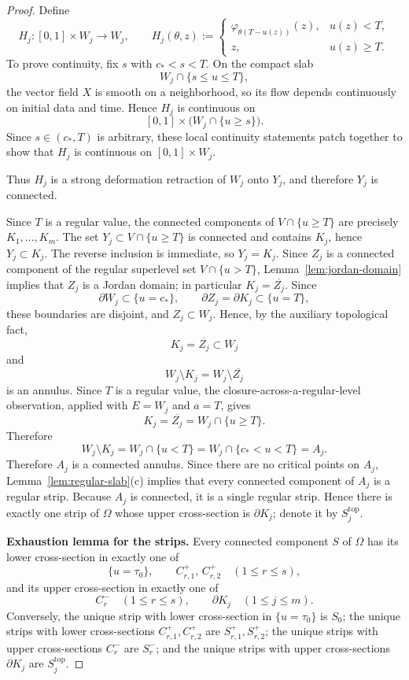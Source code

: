\documentclass[12pt]{amsart}
\theoremstyle{definition}
\theoremstyle{remark}
\begin{document}
\begin{proof}
Define
\[
H_j:[0,1]\times W_j\to W_j,
\qquad
H_j(\theta,z):=
\begin{cases}
\varphi_{\theta(T-u(z))}(z),& u(z)<T,\\[1mm]
z,& u(z)\ge T.
\end{cases}
\]
To prove continuity, fix $s$ with $c_*<s<T$. On the compact slab
\[
W_j\cap\{s\le u\le T\},
\]
the vector field $X$ is smooth on a neighborhood, so its flow depends continuously on
initial data and time. Hence $H_j$ is continuous on
\[
[0,1]\times \bigl(W_j\cap\{u\ge s\}\bigr).
\]
Since $s\in(c_*,T)$ is arbitrary, these local continuity statements patch together to show
that $H_j$ is continuous on $[0,1]\times W_j$.

Thus $H_j$ is a strong deformation retraction of $W_j$ onto $Y_j$, and therefore $Y_j$
is connected.

Since $T$ is a regular value, the connected components of $V\cap\{u\ge T\}$ are precisely $K_1,\dots,K_m$. The set $Y_j\subset V\cap\{u\ge T\}$ is connected and contains $K_j$, hence $Y_j\subset K_j$. The reverse inclusion is immediate, so $Y_j=K_j$. Since $Z_j$ is a connected component of the regular superlevel set $V\cap\{u>T\}$, Lemma~\ref{lem:jordan-domain} implies that $Z_j$ is a Jordan domain; in particular $K_j=\overline{Z_j}$. Since
\[
\partial W_j\subset \{u=c_*\},
\qquad
\partial Z_j=\partial K_j\subset \{u=T\},
\]
these boundaries are disjoint, and $Z_j\subset W_j$. Hence, by the auxiliary topological fact,
\[
K_j=\overline{Z_j}\subset W_j
\]
and
\[
W_j\setminus K_j=W_j\setminus \overline{Z_j}
\]
is an annulus. Since $T$ is a regular value, the closure-across-a-regular-level observation, applied with $E=W_j$ and $a=T$, gives
\[
K_j=\overline{Z_j}=W_j\cap\{u\ge T\}.
\]
Therefore
\[
W_j\setminus K_j
=
W_j\cap\{u<T\}
=
W_j\cap\{c_*<u<T\}
=
A_j.
\]
Therefore $A_j$ is a connected annulus. Since there are no critical points on $A_j$, Lemma~\ref{lem:regular-slab}(c) implies that every connected component of $A_j$ is a regular strip. Because $A_j$ is connected, it is a single regular strip. Hence there is exactly one strip of $\Omega$ whose upper cross-section is $\partial K_j$; denote it by $S_j^{\mathrm{top}}$.

\medskip
\noindent\textbf{Exhaustion lemma for the strips.}
Every connected component $S$ of $\Omega$ has its lower cross-section in exactly one of
\[
\{u=\tau_0\}, \qquad C_{r,1}^+,\, C_{r,2}^+ \quad (1\le r\le s),
\]
and its upper cross-section in exactly one of
\[
C_r^- \quad (1\le r\le s), \qquad \partial K_j \quad (1\le j\le m).
\]
Conversely, the unique strip with lower cross-section in $\{u=\tau_0\}$ is $S_0$;
the unique strips with lower cross-sections $C_{r,1}^+,C_{r,2}^+$ are
$S_{r,1}^+,S_{r,2}^+$; the unique strips with upper cross-sections $C_r^-$ are
$S_r^-$; and the unique strips with upper cross-sections $\partial K_j$ are
$S_j^{\mathrm{top}}$.


\end{proof}
\end{document}
